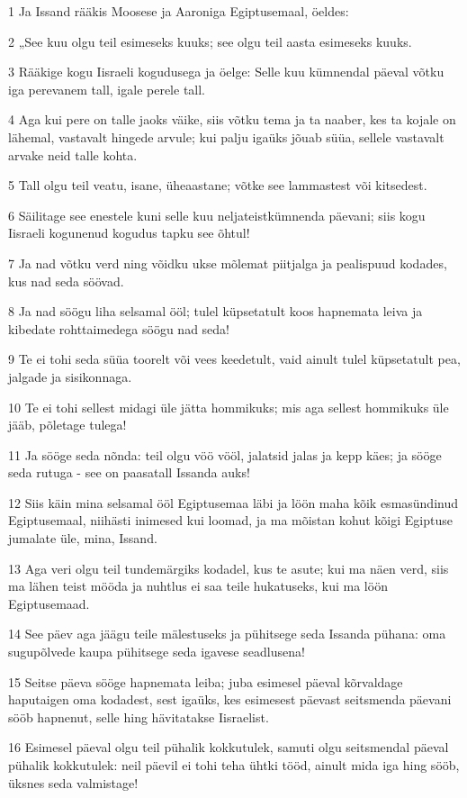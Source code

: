 \par 1 Ja Issand rääkis Moosese ja Aaroniga Egiptusemaal, öeldes:
\par 2 „See kuu olgu teil esimeseks kuuks; see olgu teil aasta esimeseks kuuks.
\par 3 Rääkige kogu Iisraeli kogudusega ja öelge: Selle kuu kümnendal päeval võtku iga perevanem tall, igale perele tall.
\par 4 Aga kui pere on talle jaoks väike, siis võtku tema ja ta naaber, kes ta kojale on lähemal, vastavalt hingede arvule; kui palju igaüks jõuab süüa, sellele vastavalt arvake neid talle kohta.
\par 5 Tall olgu teil veatu, isane, üheaastane; võtke see lammastest või kitsedest.
\par 6 Säilitage see enestele kuni selle kuu neljateistkümnenda päevani; siis kogu Iisraeli kogunenud kogudus tapku see õhtul!
\par 7 Ja nad võtku verd ning võidku ukse mõlemat piitjalga ja pealispuud kodades, kus nad seda söövad.
\par 8 Ja nad söögu liha selsamal ööl; tulel küpsetatult koos hapnemata leiva ja kibedate rohttaimedega söögu nad seda!
\par 9 Te ei tohi seda süüa toorelt või vees keedetult, vaid ainult tulel küpsetatult pea, jalgade ja sisikonnaga.
\par 10 Te ei tohi sellest midagi üle jätta hommikuks; mis aga sellest hommikuks üle jääb, põletage tulega!
\par 11 Ja sööge seda nõnda: teil olgu vöö vööl, jalatsid jalas ja kepp käes; ja sööge seda rutuga - see on paasatall Issanda auks!
\par 12 Siis käin mina selsamal ööl Egiptusemaa läbi ja löön maha kõik esmasündinud Egiptusemaal, niihästi inimesed kui loomad, ja ma mõistan kohut kõigi Egiptuse jumalate üle, mina, Issand.
\par 13 Aga veri olgu teil tundemärgiks kodadel, kus te asute; kui ma näen verd, siis ma lähen teist mööda ja nuhtlus ei saa teile hukatuseks, kui ma löön Egiptusemaad.
\par 14 See päev aga jäägu teile mälestuseks ja pühitsege seda Issanda pühana: oma sugupõlvede kaupa pühitsege seda igavese seadlusena!
\par 15 Seitse päeva sööge hapnemata leiba; juba esimesel päeval kõrvaldage haputaigen oma kodadest, sest igaüks, kes esimesest päevast seitsmenda päevani sööb hapnenut, selle hing hävitatakse Iisraelist.
\par 16 Esimesel päeval olgu teil pühalik kokkutulek, samuti olgu seitsmendal päeval pühalik kokkutulek: neil päevil ei tohi teha ühtki tööd, ainult mida iga hing sööb, üksnes seda valmistage!
